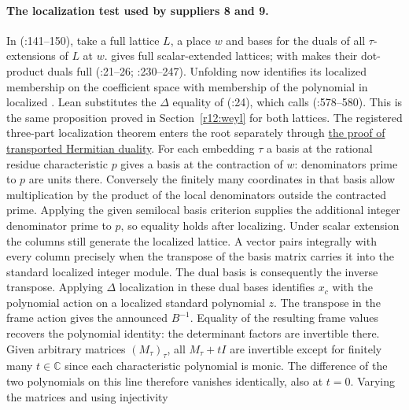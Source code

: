 \paragraph{The localization test used by suppliers 8 and 9.}\label{r13:nabdelloc}
In 
(:141--150), take a full lattice $L$, a place
$w$ and bases for the duals of all $\tau$-extensions of $L$ at $w$.
 gives full scalar-extended lattices;
 with  makes their dot-product
duals full (:21--26;
:230--247).
Unfolding  now identifies its localized membership on
the coefficient space with membership of the polynomial in localized
. Lean substitutes the $\Delta$ equality of
 (:24),
which calls 
(:578--580). This is the same
 proposition proved in Section~\ref{r12:weyl}
for both lattices. The registered three-part localization theorem
enters the root separately through \hyperref[r13:weyl-dual]{the proof of transported Hermitian duality}.
For each embedding $\tau$ a basis at the rational residue characteristic
$p$ gives a basis at the contraction of $w$: denominators prime to $p$
are units there. Conversely the finitely many coordinates in that basis
allow multiplication by the product of the local denominators outside the
contracted prime. Applying the given semilocal basis criterion supplies
the additional integer denominator prime to $p$, so equality holds after
localizing. Under scalar extension the columns still generate the localized
lattice. A vector pairs integrally with every column precisely when the
transpose of the basis matrix carries it into the standard localized
integer module. The dual basis is consequently the inverse transpose.
Applying $\Delta$ localization in these dual bases identifies $x_c$ with
the polynomial action on a localized standard polynomial $z$. The
transpose in the frame action gives the announced $B^{-1}$.
Equality of the resulting frame values recovers the polynomial identity:
the determinant factors are invertible there. Given arbitrary matrices
$(M_\tau)_\tau$, all $M_\tau+tI$ are invertible except for finitely
many $t\in\mathbb C$ since each characteristic polynomial is monic.
The difference of the two polynomials on this line therefore vanishes
identically, also at $t=0$. Varying the matrices and using injectivity
